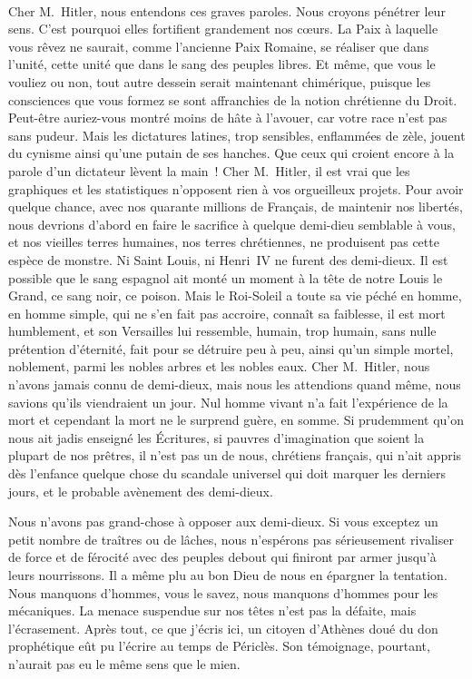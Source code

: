 \documentclass[french,twoside]{book} %
\begin{document}
\noindent  \par
Cher M. Hitler, nous entendons ces graves paroles. Nous croyons pénétrer leur sens. C’est pourquoi elles fortifient grandement nos cœurs. La Paix à laquelle vous rêvez ne saurait, comme l’ancienne Paix Romaine, se réaliser que dans l’unité, cette unité que dans le sang des peuples libres. Et même, que vous le vouliez ou non, tout autre dessein serait maintenant chimérique, puisque les consciences que vous formez se sont affranchies de la notion chrétienne du Droit. Peut-être auriez-vous montré moins de hâte à l’avouer, car votre race n’est pas sans pudeur. Mais les dictatures latines, trop sensibles, enflammées de zèle, jouent du cynisme ainsi qu’une putain de ses hanches. Que ceux qui croient encore à la parole d’un dictateur lèvent la main ! Cher M. Hitler, il est vrai que les graphiques et les statistiques n’opposent rien à vos orgueilleux projets. Pour avoir quelque chance, avec nos quarante millions de Français, de maintenir nos libertés, nous devrions d’abord en faire le sacrifice à quelque demi-dieu semblable à vous, et nos vieilles terres humaines, nos terres chrétiennes, ne produisent pas cette espèce de monstre. Ni Saint Louis, ni Henri \textsc{IV} ne furent des demi-dieux. Il est possible que le sang espagnol ait monté un moment à la tête de notre Louis le Grand, ce sang noir, ce poison. Mais le Roi-Soleil a toute sa vie péché en homme, en homme simple, qui ne s’en fait pas accroire, connaît sa faiblesse, il est mort humblement, et son Versailles lui ressemble, humain, trop humain, sans nulle prétention d’éternité, fait pour se détruire peu à peu, ainsi qu’un simple mortel, noblement, parmi les nobles arbres et les nobles eaux. Cher M. Hitler, nous n’avons jamais connu de demi-dieux, mais nous les attendions quand même, nous savions qu’ils viendraient un jour. Nul homme vivant n’a fait l’expérience de la mort et cependant la mort ne le surprend guère, en somme. Si prudemment qu’on nous ait jadis enseigné les Écritures, si pauvres d’imagination que soient la plupart de nos prêtres, il n’est pas un de nous, chrétiens français, qui n’ait appris dès l’enfance quelque chose du scandale universel qui doit marquer les derniers jours, et le probable avènement des demi-dieux.\par
Nous n’avons pas grand-chose à opposer aux demi-dieux. Si vous exceptez un petit nombre de traîtres ou de lâches, nous n’espérons pas sérieusement rivaliser de force et de férocité avec des peuples debout qui finiront par armer jusqu’à leurs nourrissons. Il a même plu au bon Dieu de nous en épargner la tentation. Nous manquons d’hommes, vous le savez, nous manquons d’hommes pour les mécaniques. La menace suspendue sur nos têtes n’est pas la défaite, mais l’écrasement. Après tout, ce que j’écris ici, un citoyen d’Athènes doué du don prophétique eût pu l’écrire au temps de Périclès. Son témoignage, pourtant, n’aurait pas eu le même sens que le mien.\par
\end{document}
